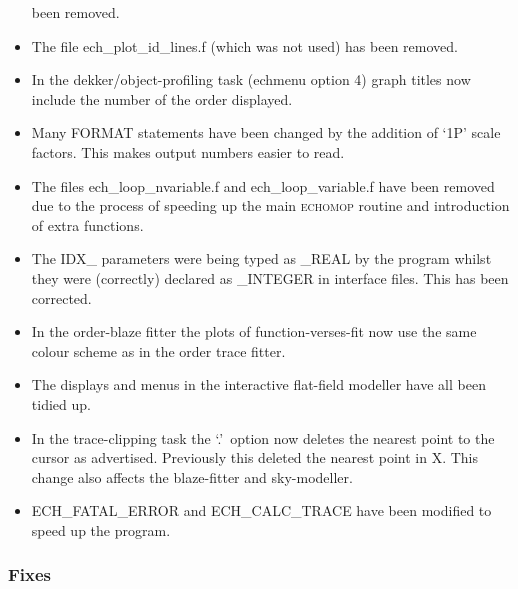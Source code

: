 \documentclass[twoside,11pt,nolof]{starlink}
\begin{document}
\begin{itemize}
   been removed.
\item The file ech\_plot\_id\_lines.f (which was not used) has been removed.
\item In the dekker/object-profiling task (echmenu option 4) graph titles
   now include the number of the order displayed.
\item Many FORMAT statements have been changed by the addition of `1P'
   scale factors.  This makes output numbers easier to read.
\item The files ech\_loop\_nvariable.f and ech\_loop\_variable.f have been
   removed due to the process of speeding up the main \textsc{echomop} routine
   and introduction of extra functions.
\item The IDX\_ parameters were being typed as \_REAL by the program whilst
   they were (correctly) declared as \_INTEGER in interface files.
   This has been corrected.
\item In the order-blaze fitter the plots of function-verses-fit now
   use the same colour scheme as in the order trace fitter.
\item The displays and menus in the interactive flat-field modeller have
   all been tidied up.
\item In the trace-clipping task the `.'\ option now deletes the nearest
   point to the cursor as advertised.  Previously this deleted the
   nearest point in X.  This change also affects the blaze-fitter and
   sky-modeller.
\item ECH\_FATAL\_ERROR and ECH\_CALC\_TRACE have been modified to speed up
   the program.
\end{itemize}

\subsubsection{Fixes}
\end{document}
